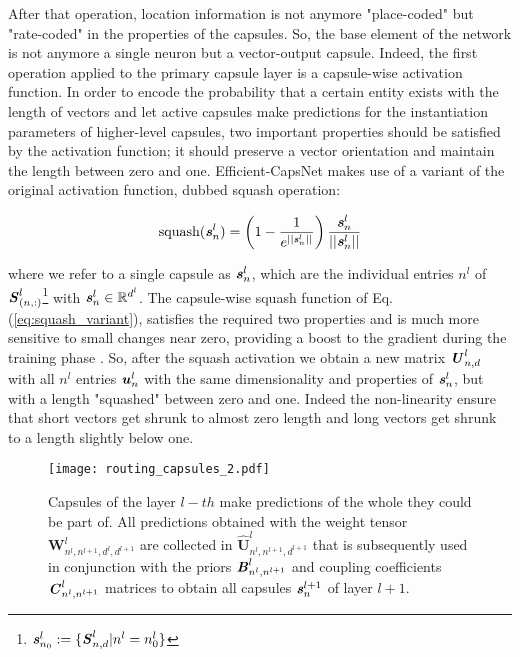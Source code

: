 \documentclass{article}
\begin{document}
After that operation, location information is not anymore "place-coded" but "rate-coded" in the properties of the capsules. So, the base element of the network is not anymore a single neuron but a vector-output capsule. Indeed, the first operation applied to the primary capsule layer is a capsule-wise activation function. In order to encode the probability that a certain entity exists with the length of vectors and let active capsules make predictions for the instantiation parameters of higher-level capsules, two important properties should be satisfied by the activation function; it should preserve a vector orientation and maintain the length between zero and one. Efficient-CapsNet makes use of a variant of the original activation function, dubbed squash operation:
\begin{ceqn}
\begin{gather}
    \textrm{squash}(\textbf{\textit{s}}^{l}_{n})=\left(1 - \frac{1}{e^{||\textbf{\textit{s}}^{l}_{n}||}}\right)\frac{\textbf{\textit{s}}^{l}_{n}}{||\textbf{\textit{s}}^{l}_{n}||}
    \label{eq:squash_variant}
\end{gather}
\end{ceqn}
where we refer to a single capsule as $\textbf{\textit{s}}^{l}_{n}$, which are the individual entries $n^l$ of $\textbf{\textit{S}}^{l}_{(n,:)}$\footnote[1]{$\textbf{\textit{s}}^{l}_{n_0}:=\{\textbf{\textit{S}}^{l}_{n,d}|n^l=n_0^l\}$} with $\textbf{\textit{s}}^{l}_{n} \in \mathbb{R}^{d^l}$. The capsule-wise squash function of Eq. (\ref{eq:squash_variant}), satisfies the required two properties and is much more sensitive to small changes near zero, providing a boost to the gradient during the training phase \cite{xi2017capsule}. So, after the squash activation we obtain a new matrix $\textbf{\textit{U}}^{l}_{n,d}$ with all $n^l$ entries $\textbf{\textit{u}}^{l}_{n}$ with the same dimensionality and properties of $\textbf{\textit{s}}^{l}_{n}$, but with a length "squashed" between zero and one. Indeed the non-linearity ensure that short vectors get shrunk to almost zero length and long vectors get shrunk to a length slightly below one.

\begin{figure}[t]
    \centering
    \texttt{[image: routing\_capsules\_2.pdf]}
    \caption{Capsules of the layer $l-th$ make predictions of the whole they could be part of. All predictions obtained with the weight tensor $\textbf{W}^{l}_{n^{l},n^{l+1},d^{l},d^{l+1}}$ are collected in $\hat{\textbf{U}}_{n^l,n^{l+1},d^{l+1}}^{l}$ that is subsequently used in conjunction with the priors $\textbf{\textit{B}}^l_{n^l,n^{l+1}}$ and coupling coefficients $\textbf{\textit{C}}^{l}_{n^l,n^{l+1}}$ matrices to obtain all capsules $\textbf{\textit{s}}^{l+1}_{n}$ of layer $l+1$.}
    \label{fig:routing_capsules}
\end{figure}
\end{document}
